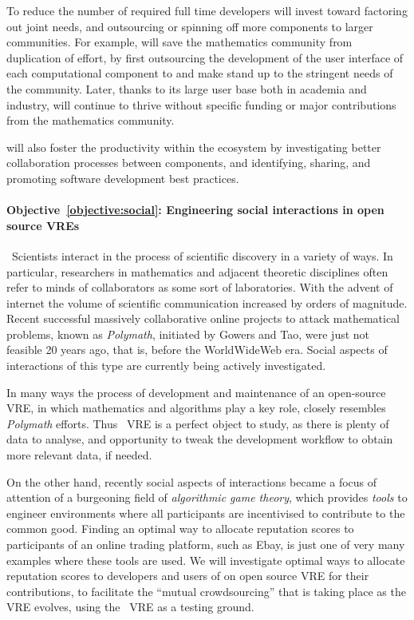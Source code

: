 \documentclass[noworkareas,deliverables,\classoptions]{euproposal}       %
\begin{document}
\begin{proposal}

To reduce the number of required full time developers \TheProject will
invest toward factoring out joint needs, and outsourcing or spinning
off more components to larger communities.
%
For example, \TheProject will save the mathematics community from
duplication of effort, by first outsourcing the development of the user
interface of each computational component to \IPython and make
\IPython stand up to the stringent needs of the community.  Later,
thanks to its large user base both in academia and industry, \IPython
will continue to thrive without specific funding or major
contributions from the mathematics community.

\TheProject will also foster the productivity within the ecosystem by
investigating better collaboration processes between components, and
identifying, sharing, and promoting software development best
practices.

\paragraph{Objective~\ref{objective:social}: Engineering social interactions in open source VREs}\
Scientists interact in the process of scientific discovery in a variety of ways.
In particular, researchers in mathematics and adjacent theoretic disciplines often refer
to minds of collaborators as some sort of laboratories. With the advent of internet
the volume of scientific communication increased by orders of magnitude. Recent
successful massively collaborative online projects to attack mathematical 
problems, known as \emph{Polymath}, initiated by Gowers and Tao, were just not 
feasible 20 years ago, that is, before the WorldWideWeb era.
Social aspects of interactions of this type are currently being actively investigated.

In many ways the process of development and maintenance of an open-source VRE, in which mathematics
and algorithms play a key role, closely resembles \emph{Polymath} efforts.
Thus \TheProject\ VRE is a perfect object to study, as there is plenty of data to analyse, and 
opportunity to tweak the development workflow to obtain more relevant data, if needed.

On the other hand, recently social aspects of interactions became a focus of attention
of a burgeoning field of \emph{algorithmic game theory}, which provides \emph{tools} to engineer 
environments where all participants are incentivised to contribute to the common good.
Finding an optimal way to allocate reputation scores to participants of
an online trading platform, such as Ebay, is just one of very many examples where
these tools are used. We will investigate optimal ways to allocate reputation scores to 
developers and users of on open source VRE for their contributions, to facilitate
the ``mutual crowdsourcing'' that is taking place as the VRE evolves, using the \TheProject\ VRE
as a testing ground.


\end{proposal}
\end{document}
